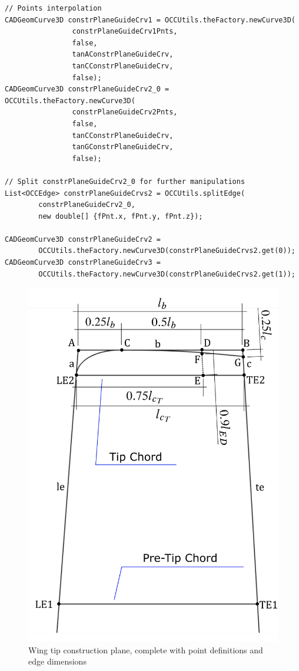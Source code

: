 \begin{lstlisting}[caption={In-plane construction curves building steps}, captionpos=b, tabsize=2, label={lst:ConstrCurves}]
// Points interpolation
CADGeomCurve3D constrPlaneGuideCrv1 = OCCUtils.theFactory.newCurve3D(
				constrPlaneGuideCrv1Pnts, 
				false, 
				tanAConstrPlaneGuideCrv, 
				tanCConstrPlaneGuideCrv, 
				false);					
CADGeomCurve3D constrPlaneGuideCrv2_0 = OCCUtils.theFactory.newCurve3D(
				constrPlaneGuideCrv2Pnts, 
				false, 
				tanCConstrPlaneGuideCrv, 
				tanGConstrPlaneGuideCrv, 
				false);
								
// Split constrPlaneGuideCrv2_0 for further manipulations
List<OCCEdge> constrPlaneGuideCrvs2 = OCCUtils.splitEdge(
		constrPlaneGuideCrv2_0, 
		new double[] {fPnt.x, fPnt.y, fPnt.z});		
		
CADGeomCurve3D constrPlaneGuideCrv2 = 
		OCCUtils.theFactory.newCurve3D(constrPlaneGuideCrvs2.get(0));
CADGeomCurve3D constrPlaneGuideCrv3 = 
		OCCUtils.theFactory.newCurve3D(constrPlaneGuideCrvs2.get(1));
\end{lstlisting}
%
\begin{figure}[H]
\centering
\includegraphics[scale=0.42]{Immagini/Capitolo3/wingtip_1}
\caption{Wing tip construction plane, complete with point definitions and edge dimensions}
\label{fig:WingTip1}
\end{figure}
